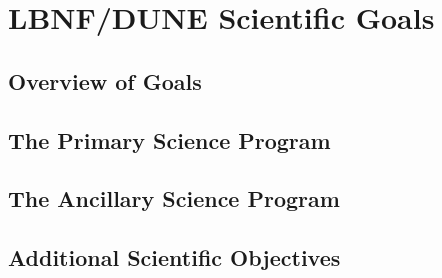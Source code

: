\chapter{LBNF/DUNE Scientific Goals}
\label{ch:physics-goals}

\section{Overview of Goals}
\label{sec:overview-goals}



\section{The Primary Science Program}
\label{sec:prim-sci-prog}


\section{The Ancillary Science Program}
\label{sec:ancill-sci-prog}



\section{Additional Scientific Objectives}
\label{sec:addl-sci-objectives}
